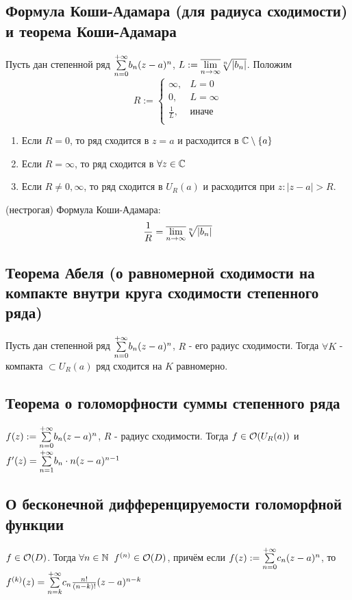 \subsection{Формула Коши-Адамара (для радиуса сходимости) и теорема Коши-Адамара}
\begin{theorem}
  Пусть дан степенной ряд $\Sum{n=0}{+\infty}b_n(z-a)^n$, $L:=\uplim{n}{\infty}\sqrt[n]{|b_n|}$. Положим
  \[R:= 
  \begin{cases}
    \infty, &L=0\\
    0, &L=\infty\\
    \frac{1}{L}, &\text{иначе }\\
  \end{cases}\]
  \begin{enumerate}
    \item Если $R=0$, то ряд сходится в $z=a$ и расходится в $\C\setminus \left\{a\right\}$ 
    \item Если $R=\infty$, то ряд сходится в $\forall z\in\C$ 
    \item Если $R\neq 0,\infty$, то ряд сходится в $U_R(a)$ и расходится при $z\colon |z-a|>R$. 
  \end{enumerate}

  (нестрогая) Формула Коши-Адамара:
  \[\frac{1}{R} = \uplim{n}{\infty}\sqrt[n]{|b_n|}\]
\end{theorem}
\subsection{Теорема Абеля (о равномерной сходимости на компакте внутри круга сходимости степенного
ряда)}
\begin{theorem}
  Пусть дан степенной ряд $\Sum{n=0}{+\infty}b_n(z-a)^n$, $R$ - его радиус сходимости. Тогда $\forall K$ - компакта $\subset U_R(a)$ ряд сходится на $K$ равномерно.
\end{theorem}
\subsection{Теорема о голоморфности суммы степенного ряда}
\begin{theorem}
  $f(z):=\Sum{n=0}{+\infty}b_n(z-a)^n$, $R$ - радиус сходимости. Тогда $f\in\O(U_R(a))$ и $f'(z)=\Sum{n=1}{+\infty}b_n\cdot n(z-a)^{n-1}$ 
\end{theorem}
\subsection{О бесконечной дифференцируемости голоморфной функции}
\begin{theorem}
  $f\in\O(D)$. Тогда $\forall n\in\N\q f^{(n)}\in \O(D)$, причём если $f(z):=\Sum{n=0}{+\infty}c_n(z-a)^n$, то $f^{(k)}(z)=\Sum{n=k}{+\infty}c_n \frac{n!}{(n-k)!}(z-a)^{n-k}$ 
\end{theorem}
